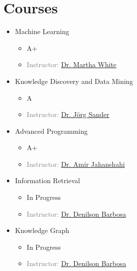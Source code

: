 \section{Courses}
\begin{multicols}{2}
\begin{itemize}
	\item {} Machine Learning
	\begin{itemize}
		\item A+
		\item \textcolor{gray}{Instructor: \href{http://webdocs.cs.ualberta.ca/~whitem/}{Dr. Martha White}}
	\end{itemize}

	\item {} Knowledge Discovery and Data Mining
	\begin{itemize}
		\item A 
		\item \textcolor{gray}{Instructor: \href{http://webdocs.cs.ualberta.ca/~joerg/}{Dr. Jörg Sander}}
	\end{itemize}
	
	\item {} Advanced Programming
	\begin{itemize}
		\item A+ 
		\item \textcolor{gray}{Instructor: \href{http://ee.aut.ac.ir/autcms/people/verticalPagesAjax/professorHomePage.htm?url=jahanshahi&depurl=electrical-engineering&lang=en&cid=50451496}{Dr. Amir Jahanshahi}}
		
	\end{itemize}

	\item {} Information Retrieval
	\begin{itemize}
		\item In Progress 
		\item \textcolor{gray}{Instructor: \href{https://sites.ualberta.ca/~denilson/}{Dr. Denilson Barbosa}}
	\end{itemize}

	\item {} Knowledge Graph
	\begin{itemize}
		\item In Progress 
		\item \textcolor{gray}{Instructor: \href{https://sites.ualberta.ca/~denilson/}{Dr. Denilson Barbosa}}
	\end{itemize}


\end{itemize}
\end{multicols}
